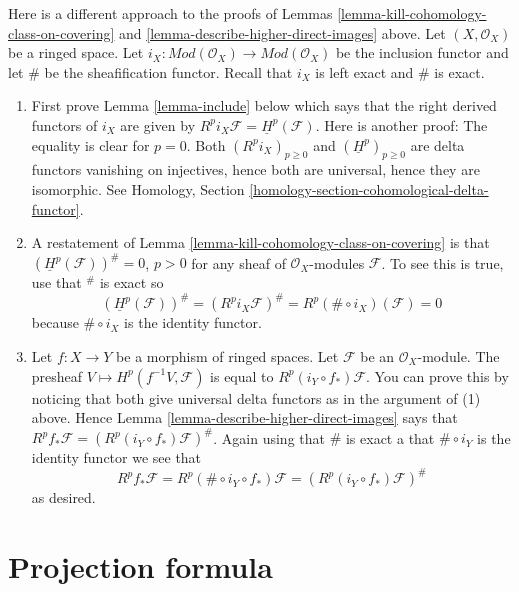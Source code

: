 \begin{remark}
\label{remark-daniel}
Here is a different approach to the proofs of
Lemmas \ref{lemma-kill-cohomology-class-on-covering} and
\ref{lemma-describe-higher-direct-images} above.
Let $(X, \mathcal{O}_X)$ be a ringed space.
Let $i_X : \textit{Mod}(\mathcal{O}_X) \to \textit{Mod}(\mathcal{O}_X)$
be the inclusion functor and let $\#$ be the sheafification functor.
Recall that $i_X$ is left exact and $\#$ is exact.
\begin{enumerate}
\item First prove Lemma \ref{lemma-include} below which says that the
right derived functors of $i_X$ are given by
$R^pi_X\mathcal{F} = \underline{H}^p(\mathcal{F})$.
Here is another proof: The equality is clear for $p = 0$.
Both $(R^pi_X)_{p \geq 0}$ and $(\underline{H}^p)_{p \geq 0}$
are delta functors vanishing on injectives, hence both are universal,
hence they are isomorphic. See Homology,
Section \ref{homology-section-cohomological-delta-functor}.
\item A restatement of Lemma \ref{lemma-kill-cohomology-class-on-covering}
is that $(\underline{H}^p(\mathcal{F}))^\# = 0$, $p > 0$ for any sheaf of
$\mathcal{O}_X$-modules $\mathcal{F}$.
To see this is true, use that ${}^\#$ is exact so
$$
(\underline{H}^p(\mathcal{F}))^\# =
(R^pi_X\mathcal{F})^\# =
R^p(\# \circ i_X)(\mathcal{F}) = 0
$$
because $\# \circ i_X$ is the identity functor.
\item Let $f : X \to Y$ be a morphism of ringed spaces.
Let $\mathcal{F}$ be an $\mathcal{O}_X$-module. The presheaf
$V \mapsto H^p(f^{-1}V, \mathcal{F})$ is equal to
$R^p (i_Y \circ f_*)\mathcal{F}$. You can prove this by noticing that
both give universal delta functors as in the argument of (1) above.
Hence Lemma \ref{lemma-describe-higher-direct-images}
says that $R^p f_* \mathcal{F}= (R^p (i_Y \circ f_*)\mathcal{F})^\#$.
Again using that $\#$ is exact a that $\# \circ i_Y$ is the identity
functor we see that
$$
R^p f_* \mathcal{F} =
R^p(\# \circ i_Y \circ f_*)\mathcal{F} =
(R^p (i_Y \circ f_*)\mathcal{F})^\#
$$
as desired.
\end{enumerate}
\end{remark}











\section{Projection formula}
\label{section-projection-formula}

